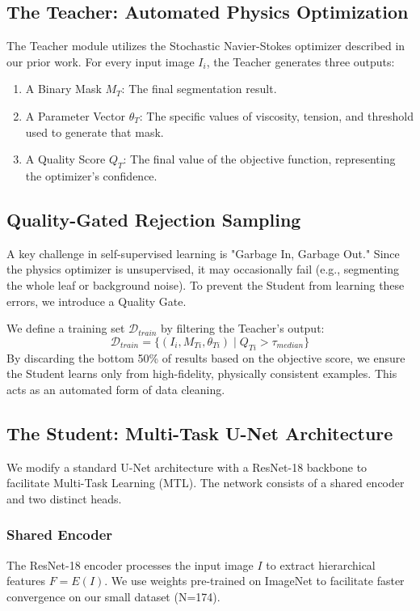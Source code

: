 \documentclass[journal]{IEEEtran}
\begin{document}
\subsection{The Teacher: Automated Physics Optimization}
The Teacher module utilizes the Stochastic Navier-Stokes optimizer described in our prior work. For every input image $I_i$, the Teacher generates three outputs:
\begin{enumerate}
    \item A Binary Mask $M_T$: The final segmentation result.
    \item A Parameter Vector $\theta_T$: The specific values of viscosity, tension, and threshold used to generate that mask.
    \item A Quality Score $Q_T$: The final value of the objective function, representing the optimizer's confidence.
\end{enumerate}

\subsection{Quality-Gated Rejection Sampling}
A key challenge in self-supervised learning is "Garbage In, Garbage Out." Since the physics optimizer is unsupervised, it may occasionally fail (e.g., segmenting the whole leaf or background noise). To prevent the Student from learning these errors, we introduce a Quality Gate.

We define a training set $\mathcal{D}_{train}$ by filtering the Teacher's output:
\begin{equation}
\mathcal{D}_{train} = \{ (I_i, M_{Ti}, \theta_{Ti}) \mid Q_{Ti} > \tau_{median} \}
\end{equation}
By discarding the bottom 50\% of results based on the objective score, we ensure the Student learns only from high-fidelity, physically consistent examples. This acts as an automated form of data cleaning.

\subsection{The Student: Multi-Task U-Net Architecture}
We modify a standard U-Net architecture with a ResNet-18 backbone to facilitate Multi-Task Learning (MTL). The network consists of a shared encoder and two distinct heads.

\subsubsection{Shared Encoder}
The ResNet-18 encoder processes the input image $I$ to extract hierarchical features $F = E(I)$. We use weights pre-trained on ImageNet to facilitate faster convergence on our small dataset (N=174).
\end{document}
